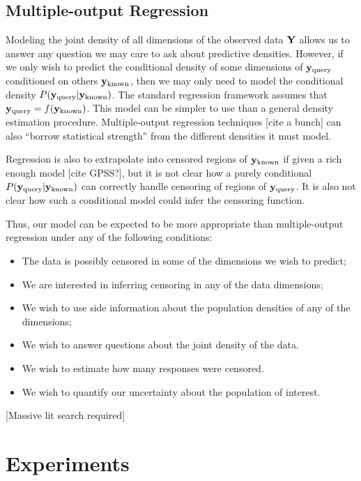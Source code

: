 \documentclass{article}
\begin{document}
\subsection{Multiple-output Regression}

Modeling the joint density of all dimensions of the observed data $\mathbf{Y}$ allows us to answer any question we may care to ask about predictive densities.  However, if we only wish to predict the conditional density of some dimensions of ${\bf{y}}_{\textrm{query}}$ conditioned on others ${\bf{y}}_{\textrm{known}}$, then we may only need to model the conditional density $P( {\bf{y}}_{\textrm{query}} | {\bf{y}}_{\textrm{known}})$.  The standard regression framework assumes that ${\bf{y}}_{\textrm{query}} = f({\bf{y}}_{\textrm{known}})$.  This model can be simpler to use than a general density estimation procedure.  Multiple-output regression techniques [cite a bunch] can also ``borrow statistical strength'' from the different densities it must model.

Regression is also to extrapolate into censored regions of ${\bf{y}}_{\textrm{known}}$ if given a rich enough model [cite GPSS?], but it is not clear how a purely conditional $P( {\bf{y}}_{\textrm{query}} | {\bf{y}}_{\textrm{known}})$ can correctly handle censoring of regions of ${\bf{y}}_{\textrm{query}}$.  It is also not clear how such a conditional model could infer the censoring function.

Thus, our model can be expected to be more appropriate than multiple-output regression under any of the following conditions:
\begin{itemize}
	\item The data is possibly censored in some of the dimensions we wish to predict;
	\item We are interested in inferring censoring in any of the data dimensions;
	\item We wish to use side information about the population densities of any of the dimensions;
	\item We wish to answer questions about the joint density of the data.
	\item We wish to estimate how many responses were censored.
	\item We wish to quantify our uncertainty about the population of interest.
\end{itemize}

[Massive lit search required]


\section{Experiments}
\end{document}
